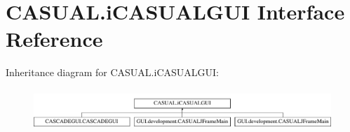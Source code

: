 \hypertarget{interfaceCASUAL_1_1iCASUALGUI}{\section{C\-A\-S\-U\-A\-L.\-i\-C\-A\-S\-U\-A\-L\-G\-U\-I Interface Reference}
\label{interfaceCASUAL_1_1iCASUALGUI}
}
Inheritance diagram for C\-A\-S\-U\-A\-L.\-i\-C\-A\-S\-U\-A\-L\-G\-U\-I\-:\begin{figure}[H]
\begin{center}
\leavevmode
\includegraphics[height=1.555556cm]{interfaceCASUAL_1_1iCASUALGUI}
\end{center}
\end{figure}
